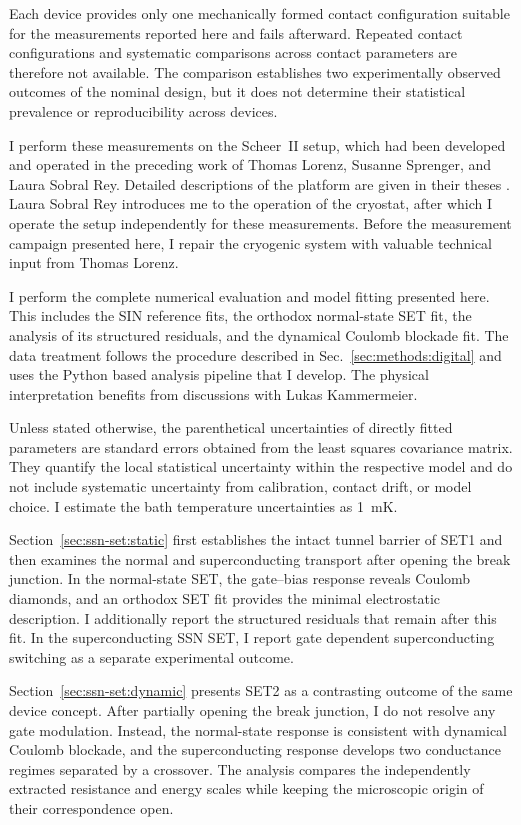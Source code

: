     Each device provides only one mechanically formed contact configuration suitable for the measurements reported here and fails afterward. Repeated contact configurations and systematic comparisons across contact parameters are therefore not available. The comparison establishes two experimentally observed outcomes of the nominal design, but it does not determine their statistical prevalence or reproducibility across devices.

    I perform these measurements on the Scheer~II setup, which had been developed and operated in the preceding work of Thomas Lorenz, Susanne Sprenger, and Laura Sobral Rey. Detailed descriptions of the platform are given in their theses \cite{lorenz_wechselspiel_2018,sprenger_interplay_2019,sobral_rey_interplay_2022}. Laura Sobral Rey introduces me to the operation of the cryostat, after which I operate the setup independently for these measurements. Before the measurement campaign presented here, I repair the cryogenic system with valuable technical input from Thomas Lorenz.

    I perform the complete numerical evaluation and model fitting presented here. This includes the SIN reference fits, the orthodox normal-state SET fit, the analysis of its structured residuals, and the dynamical Coulomb blockade fit. The data treatment follows the procedure described in Sec.~\ref{sec:methods:digital} and uses the Python based analysis pipeline that I develop. The physical interpretation benefits from discussions with Lukas Kammermeier.

    Unless stated otherwise, the parenthetical uncertainties of directly fitted parameters are standard errors obtained from the least squares covariance matrix. They quantify the local statistical uncertainty within the respective model and do not include systematic uncertainty from calibration, contact drift, or model choice. I estimate the bath temperature uncertainties as \qty{1}{\milli\kelvin}.

    Section~\ref{sec:ssn-set:static} first establishes the intact tunnel barrier of SET1 and then examines the normal and superconducting transport after opening the break junction. In the normal-state SET, the gate--bias response reveals Coulomb diamonds, and an orthodox SET fit provides the minimal electrostatic description. I additionally report the structured residuals that remain after this fit. In the superconducting SSN SET, I report gate dependent superconducting switching as a separate experimental outcome.

    Section~\ref{sec:ssn-set:dynamic} presents SET2 as a contrasting outcome of the same device concept. After partially opening the break junction, I do not resolve any gate modulation. Instead, the normal-state response is consistent with dynamical Coulomb blockade, and the superconducting response develops two conductance regimes separated by a crossover. The analysis compares the independently extracted resistance and energy scales while keeping the microscopic origin of their correspondence open.

    
    
